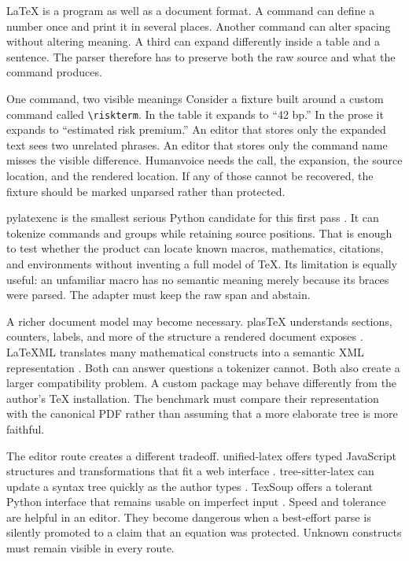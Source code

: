 LaTeX is a program as well as a document format. A command can define a number
once and print it in several places. Another command can alter spacing without
altering meaning. A third can expand differently inside a table and a sentence.
The parser therefore has to preserve both the raw source and what the command
produces.

\begin{cardexample}{One command, two visible meanings}
Consider a fixture built around a custom command called
\verb|\riskterm|. In the table it expands to ``42 bp.'' In the prose it expands
to ``estimated risk premium.'' An editor that stores only the expanded text
sees two unrelated phrases. An editor that stores only the command name misses
the visible difference. Humanvoice needs the call, the expansion, the source
location, and the rendered location. If any of those cannot be recovered, the
fixture should be marked unparsed rather than protected.
\end{cardexample}

pylatexenc is the smallest serious Python candidate for this first pass
\citep{pylatexenc2026}. It can tokenize commands and groups while retaining
source positions. That is enough to test whether the product can locate known
macros, mathematics, citations, and environments without inventing a full
model of TeX. Its limitation is equally useful: an unfamiliar macro has no
semantic meaning merely because its braces were parsed. The adapter must keep
the raw span and abstain.

\Needspace{13cm}
A richer document model may become necessary. plasTeX understands sections,
counters, labels, and more of the structure a rendered document exposes
\citep{plastex2026}. LaTeXML translates many mathematical constructs into a
semantic XML representation \citep{latexml2026}. Both can answer questions a
tokenizer cannot. Both also create a larger compatibility problem. A custom
package may behave differently from the author's TeX installation. The
benchmark must compare their representation with the canonical PDF rather than
assuming that a more elaborate tree is more faithful.

The editor route creates a different tradeoff. unified-latex offers typed
JavaScript structures and transformations that fit a web interface
\citep{unifiedlatex2026}. tree-sitter-latex can update a syntax tree quickly as
the author types \citep{treesitterlatex2026}. TexSoup offers a tolerant Python
interface that remains usable on imperfect input \citep{texsoup2026}. Speed and
tolerance are helpful in an editor. They become dangerous when a best-effort
parse is silently promoted to a claim that an equation was protected. Unknown
constructs must remain visible in every route.

